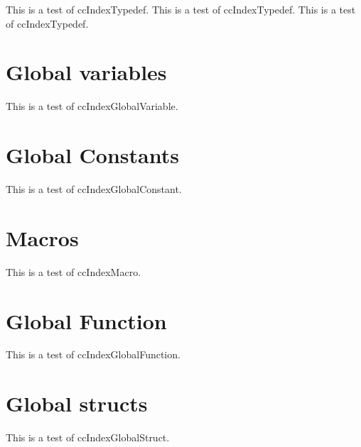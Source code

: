 \documentclass{article}
\begin{document}
{{{{

This is a test of ccIndexTypedef.
This is a test of ccIndexTypedef.
This is a test of ccIndexTypedef.

\section{Global variables}

\ccGlue
{}

This is a test of ccIndexGlobalVariable.

\section{Global Constants}
This is a test of ccIndexGlobalConstant.

\section{Macros}
This is a test of ccIndexMacro.

\section{Global Function}
This is a test of ccIndexGlobalFunction.

\section{Global structs}

This is a test of ccIndexGlobalStruct.


}}}}
\end{document}
